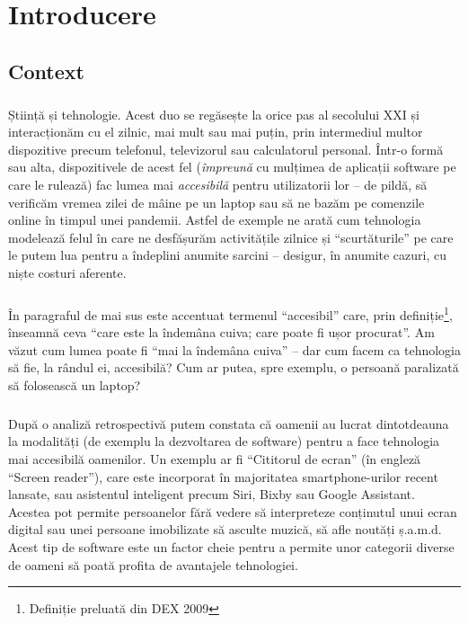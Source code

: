 \chapter*{Introducere} 

\section*{Context}
\paragraph{}
Știință și tehnologie.
Acest duo se regăsește la orice pas al secolului XXI și interacționăm cu el zilnic, mai mult sau mai puțin, prin intermediul multor dispozitive precum telefonul, televizorul sau calculatorul personal.
Într-o formă sau alta, dispozitivele de acest fel (\emph{împreună} cu mulțimea de aplicații software pe care le rulează) fac lumea mai \emph{accesibilă} pentru utilizatorii lor – de pildă, să verificăm vremea zilei de mâine pe un laptop sau să ne bazăm pe comenzile online în timpul unei pandemii.
Astfel de exemple ne arată cum tehnologia modelează felul în care ne desfășurăm activitățile zilnice și ``scurtăturile'' pe care le putem lua pentru a îndeplini anumite sarcini – desigur, în anumite cazuri, cu niște costuri aferente.

\paragraph{}
În paragraful de mai sus este accentuat termenul ``accesibil'' care, prin definiție\footnote{Definiție preluată din DEX 2009}, înseamnă ceva ``care este la îndemâna cuiva; care poate fi ușor procurat''.
Am văzut cum lumea poate fi ``mai la îndemâna cuiva'' – dar cum facem ca tehnologia să fie, la rândul ei, accesibilă?
Cum ar putea, spre exemplu, o persoană paralizată să folosească un laptop?

\paragraph{}
După o analiză retrospectivă putem constata că oamenii au lucrat dintotdeauna la modalități (de exemplu la dezvoltarea de software) pentru a face tehnologia mai accesibilă oamenilor.
Un exemplu ar fi ``Cititorul de ecran'' (în engleză ``Screen reader''), care este incorporat în majoritatea smartphone-urilor recent lansate, sau asistentul inteligent precum Siri, Bixby sau Google Assistant.
Acestea pot permite persoanelor fără vedere să interpreteze conținutul unui ecran digital sau unei persoane imobilizate să asculte muzică, să afle noutăți ș.a.m.d.
Acest tip de software este un factor cheie pentru a permite unor categorii diverse de oameni să poată profita de avantajele tehnologiei.

